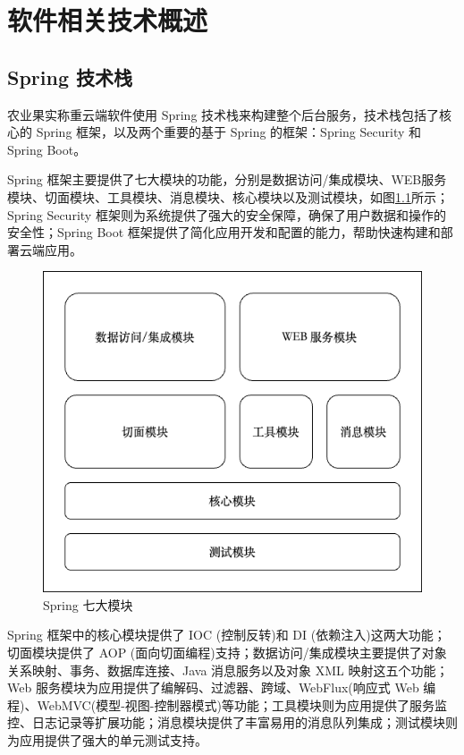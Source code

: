 \chapter{软件相关技术概述}

\section{Spring 技术栈}

农业果实称重云端软件使用 Spring 技术栈来构建整个后台服务，技术栈包括了核心的 Spring 框架，以及两个重要的基于 Spring 的框架：Spring Security 和 Spring Boot。

Spring 框架主要提供了七大模块的功能，分别是数据访问/集成模块、WEB服务模块、切面模块、工具模块、消息模块、核心模块以及测试模块，如图\ref{fig:Spring}所示；Spring Security 框架则为系统提供了强大的安全保障，确保了用户数据和操作的安全性；Spring Boot 框架提供了简化应用开发和配置的能力，帮助快速构建和部署云端应用。

\begin{figure}[H]
    \centering
    \includegraphics[width=0.8\linewidth]{../design/Spring.png}
    \caption{Spring 七大模块}
    \label{fig:Spring}
\end{figure}

Spring 框架中的核心模块提供了 IOC (控制反转)和 DI (依赖注入)这两大功能；切面模块提供了 AOP (面向切面编程)支持；数据访问/集成模块主要提供了对象关系映射、事务、数据库连接、Java 消息服务以及对象 XML 映射这五个功能；Web 服务模块为应用提供了编解码、过滤器、跨域、WebFlux(响应式 Web 编程)、WebMVC(模型-视图-控制器模式)等功能；工具模块则为应用提供了服务监控、日志记录等扩展功能；消息模块提供了丰富易用的消息队列集成；测试模块则为应用提供了强大的单元测试支持\cite{Spring-框架概述}。

